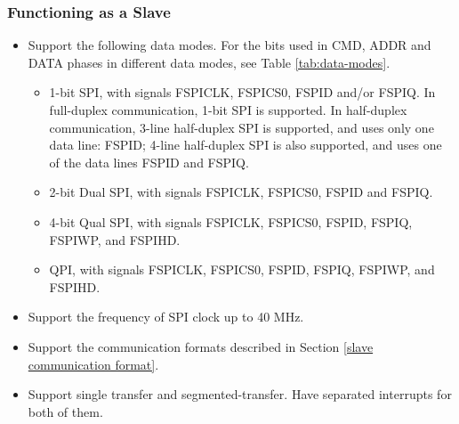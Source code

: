 \documentclass[main\_\_EN.tex]{subfiles}
\begin{document}
\subsubsection{Functioning as a Slave}
  \begin{itemize}
      \item Support the following data modes. For the bits used in CMD, ADDR and DATA phases in different data modes, see Table \ref{tab:data-modes}.
      \begin{itemize}
            \item 1-bit SPI, with signals FSPICLK, FSPICS0, FSPID and/or FSPIQ. In full-duplex communication, 1-bit SPI is supported. In half-duplex communication, 3-line half-duplex SPI is supported, and uses only one data line: FSPID; 4-line half-duplex SPI is also supported, and uses one of the data lines FSPID and FSPIQ.

            \item 2-bit Dual SPI, with signals FSPICLK, FSPICS0, FSPID and FSPIQ.

            \item 4-bit Qual SPI, with signals FSPICLK, FSPICS0, FSPID, FSPIQ, FSPIWP, and FSPIHD.

            \item QPI, with signals FSPICLK, FSPICS0, FSPID, FSPIQ, FSPIWP, and FSPIHD.

      \end{itemize}
      \item Support the frequency of SPI clock up to 40 MHz.
      \item Support the communication formats described in Section \ref{slave communication format}.
      \item Support single transfer and segmented-transfer. Have separated interrupts for both of them.
  \end{itemize}
\end{document}

